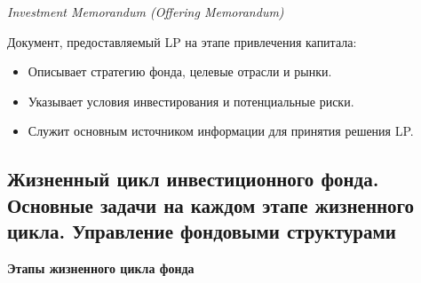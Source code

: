 \textit{Investment Memorandum (Offering Memorandum)}

Документ, предоставляемый LP на этапе привлечения капитала:
\begin{itemize}
    \item Описывает стратегию фонда, целевые отрасли и рынки.
    \item Указывает условия инвестирования и потенциальные риски.
    \item Служит основным источником информации для принятия решения LP.
\end{itemize}


\pagebreak
\subsection{Жизненный цикл инвестиционного фонда. Основные задачи на каждом этапе жизненного цикла. Управление фондовыми структурами}

\textbf{Этапы жизненного цикла фонда}

